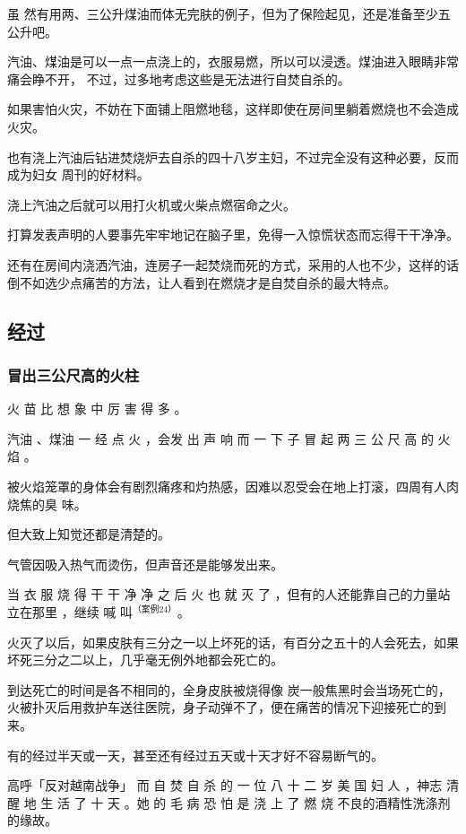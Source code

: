 \documentclass[UTF8]{ctexart}
\begin{document}
虽 然有用两、三公升煤油而体无完肤的例子，但为了保险起见，还是准备至少五公升吧。

汽油、煤油是可以一点一点浇上的，衣服易燃，所以可以浸透。煤油进入眼睛非常痛会睁不开，
不过，过多地考虑这些是无法进行自焚自杀的。

如果害怕火灾，不妨在下面铺上阻燃地毯，这样即使在房间里躺着燃烧也不会造成火灾。

也有浇上汽油后钻进焚烧炉去自杀的四十八岁主妇，不过完全没有这种必要，反而成为妇女
周刊的好材料。

浇上汽油之后就可以用打火机或火柴点燃宿命之火。

打算发表声明的人要事先牢牢地记在脑子里，免得一入惊慌状态而忘得干干净净。

还有在房间内浇洒汽油，连房子一起焚烧而死的方式，采用的人也不少，这样的话倒不如选少点痛苦的方法，让人看到在燃烧才是自焚自杀的最大特点。

\subsection{经过}

\subsubsection*{冒出三公尺高的火柱}


火 苗 比 想 象 中 厉 害 得 多 。

汽油 、煤油 一 经 点 火 ，会发 出 声 响 而 一 下 子 冒 起 两 三 公 尺 高 的 火 焰 。

被火焰笼罩的身体会有剧烈痛疼和灼热感，因难以忍受会在地上打滚，四周有人肉烧焦的臭 味。

但大致上知觉还都是清楚的。

气管因吸入热气而烫伤，但声音还是能够发出来。 

当 衣 服 烧 得 干 干 净 净 之 后 火 也 就 灭 了 ，但有的人还能靠自己的力量站立在那里 ，继续 喊 叫$^{（ 案例 24）}$。 

火灭了以后，如果皮肤有三分之一以上坏死的话，有百分之五十的人会死去，如果坏死三分之二以上，几乎毫无例外地都会死亡的。

到达死亡的时间是各不相同的，全身皮肤被烧得像 炭一般焦黑时会当场死亡的，火被扑灭后用救护车送往医院，身子动弹不了，便在痛苦的情况下迎接死亡的到来。

有的经过半天或一天，甚至还有经过五天或十天才好不容易断气的。

高呼「反对越南战争」 而 自 焚 自 杀 的 一 位 八 十 二 岁 美 国 妇 人 ，神志 清 醒 地 生 活 了 十 天 。她 的 毛 病 恐 怕 是 浇 上 了 燃 烧 不良的酒精性洗涤剂的缘故。 
\end{document}
